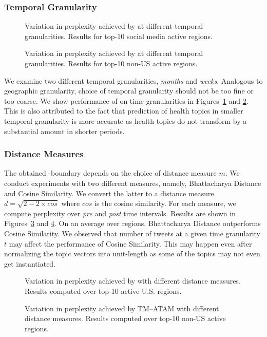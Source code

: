 \subsubsection{Temporal Granularity}
\begin{figure}[t!]
\centering
{}
\caption{Variation in perplexity achieved by \tmatam at different 
temporal granularities. Results for top-10 social media active regions.}
\label{fig:perplexityTemporalUS}
\end{figure}
\begin{figure}[b!]
\centering
{}
\caption{Variation in perplexity achieved by \tmatam at different 
temporal granularities. Results for top-10 non-US active regions.}
\label{fig:perplexityTemporalNonUS}
\end{figure}
We examine two different temporal granularities, \emph{months} 
and \emph{weeks}. Analogous to geographic granularity, choice of temporal 
granularity should not be too fine or too coarse. We show performance 
of \tmatam on time granularities in Figures~\ref{fig:perplexityTemporalUS} 
and \ref{fig:perplexityTemporalNonUS}. 
This is also attributed to the fact that prediction of health topics in smaller temporal granularity is more accurate as health topics do not transform by a substantial amount in shorter periods.
\subsubsection{Distance Measures}
The obtained \change-boundary depends on the choice of distance measure $m$.
We conduct experiments with two different measures, namely, Bhattacharya
Distance and Cosine Similarity. We convert the latter to a distance
measure $d=\sqrt{2-2\times cos}$ where $cos$ is the cosine similarity.
For each measure, we compute perplexity over \emph{pre} and \emph{post} 
time intervals. Results are shown in Figures~\ref{fig:perplexityMeasureUS} 
and \ref{fig:perplexityMeasureNonUS}. On an average over regions, 
Bhattacharya Distance outperforms Cosine Similarity. We observed that number of 
tweets at a given time granularity $t$ may affect the performance of Cosine Similarity. This may
happen even after normalizing the topic vectors into unit-length as some of the topics may not even get instantiated.
\begin{figure}[t!]
\centering
{}
\caption{Variation in perplexity achieved by \tmatam with different 
distance measures. Results computed over top-10 active U.S. regions.}
\label{fig:perplexityMeasureUS}
\end{figure}
\begin{figure}[t!]
\centering
{}
\caption{Variation in perplexity achieved by
TM–ATAM with different distance measures. Results
computed over top-10 non-US active regions.}
\label{fig:perplexityMeasureNonUS}
\end{figure}
